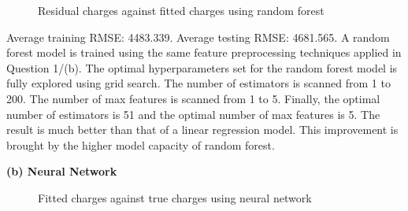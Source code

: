 \documentclass{article}
\begin{document}
\begin{figure}[!htbp]
\centering
{}
\caption{Residual charges against fitted charges using random forest} \label{3_4_b_RF_2}
\end{figure}

Average training RMSE: 4483.339.\newline
\indent Average testing RMSE: 4681.565.\newline
\indent A random forest model is trained using the same feature preprocessing techniques applied in Question 1/(b). The optimal hyperparameters set for the random forest model is fully explored using grid search. The number of estimators is scanned from 1 to 200. The number of max features is scanned from 1 to 5. Finally, the optimal number of estimators is 51 and the optimal number of max features is 5. The result is much better than that of a linear regression model. This improvement is brought by the higher model capacity of random forest.\bigbreak

\noindent \textbf{(b) Neural Network} \bigbreak

\begin{figure}[!htbp]
\centering
{}
\caption{Fitted charges against true charges using neural network} \label{3_4_b_Neural_1}
\end{figure}
\end{document}
